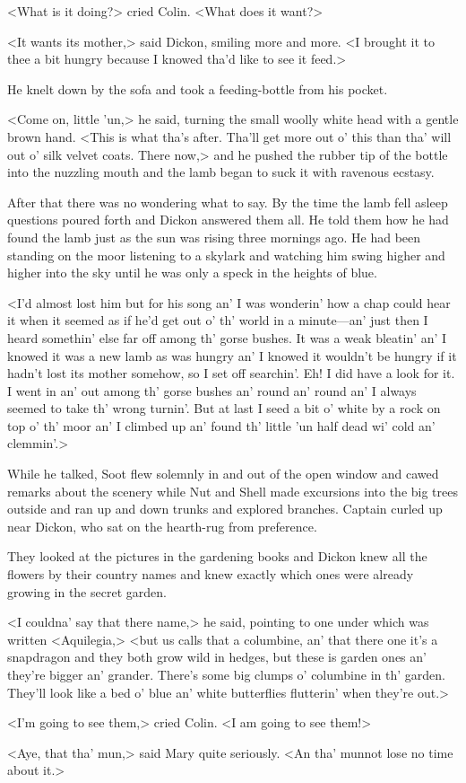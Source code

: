 <What is it doing?> cried Colin. <What does it want?>

<It wants its mother,> said Dickon, smiling more and more. <I brought it to thee a bit hungry because I knowed tha'd like to see it feed.>

He knelt down by the sofa and took a feeding-bottle from his pocket.

<Come on, little 'un,> he said, turning the small woolly white head with a gentle brown hand. <This is what tha's after. Tha'll get more out o' this than tha' will out o' silk velvet coats. There now,> and he pushed the rubber tip of the bottle into the nuzzling mouth and the lamb began to suck it with ravenous ecstasy.

After that there was no wondering what to say. By the time the lamb fell asleep questions poured forth and Dickon answered them all. He told them how he had found the lamb just as the sun was rising three mornings ago. He had been standing on the moor listening to a skylark and watching him swing higher and higher into the sky until he was only a speck in the heights of blue.

<I'd almost lost him but for his song an' I was wonderin' how a chap could hear it when it seemed as if he'd get out o' th' world in a minute—an' just then I heard somethin' else far off among th' gorse bushes. It was a weak bleatin' an' I knowed it was a new lamb as was hungry an' I knowed it wouldn't be hungry if it hadn't lost its mother somehow, so I set off searchin'. Eh! I did have a look for it. I went in an' out among th' gorse bushes an' round an' round an' I always seemed to take th' wrong turnin'. But at last I seed a bit o' white by a rock on top o' th' moor an' I climbed up an' found th' little 'un half dead wi' cold an' clemmin'.>

While he talked, Soot flew solemnly in and out of the open window and cawed remarks about the scenery while Nut and Shell made excursions into the big trees outside and ran up and down trunks and explored branches. Captain curled up near Dickon, who sat on the hearth-rug from preference.

They looked at the pictures in the gardening books and Dickon knew all the flowers by their country names and knew exactly which ones were already growing in the secret garden.

<I couldna' say that there name,> he said, pointing to one under which was written <Aquilegia,> <but us calls that a columbine, an' that there one it's a snapdragon and they both grow wild in hedges, but these is garden ones an' they're bigger an' grander. There's some big clumps o' columbine in th' garden. They'll look like a bed o' blue an' white butterflies flutterin' when they're out.>

<I'm going to see them,> cried Colin. <I am going to see them!>

<Aye, that tha' mun,> said Mary quite seriously. <An tha' munnot lose no time about it.>